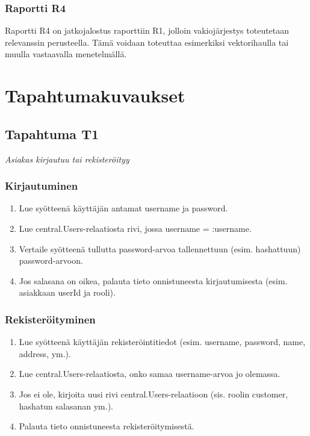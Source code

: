 \documentclass[11pt,a4paper]{article}
\begin{document}
\subsubsection{Raportti R4}

Raportti R4 on jatkojalostus raporttiin R1, jolloin vakiojärjestys toteutetaan relevanssin perusteella. Tämä voidaan toteuttaa esimerkiksi vektorihaulla tai muulla vastaavalla menetelmällä.

\section{Tapahtumakuvaukset}

\subsection{Tapahtuma T1}
{\large{\textit{Asiakas kirjautuu tai rekisteröityy}}}

\subsubsection{Kirjautuminen}

\begin{enumerate}
	\item Lue syötteenä käyttäjän antamat username ja password.
	\item Lue central.Users-relaatiosta rivi, jossa username = :username.
	\item Vertaile syötteenä tullutta password-arvoa tallennettuun (esim. hashattuun) password-arvoon.
	\item Jos salasana on oikea, palauta tieto onnistuneesta kirjautumisesta (esim. asiakkaan userId ja rooli).
\end{enumerate}

\subsubsection{Rekisteröityminen}

\begin{enumerate}
	\item Lue syötteenä käyttäjän rekisteröintitiedot (esim. username, password, name, address, ym.).
	\item Lue central.Users-relaatiosta, onko samaa username-arvoa jo olemassa.
	\item Jos ei ole, kirjoita uusi rivi central.Users-relaatioon (sis. roolin customer, hashatun salasanan ym.).
	\item Palauta tieto onnistuneesta rekisteröitymisestä.
\end{enumerate}
\end{document}
